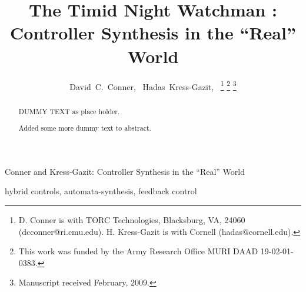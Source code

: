 \documentclass[journal,twoside]{IEEEtran}
\def \TROTITLE {{ The Timid Night Watchman :\\ Controller Synthesis in the ``Real'' World}}
\def \SHORTTROTITLE {{ Controller Synthesis in the ``Real'' World }}
\begin{document}
%

\title{\TROTITLE}

\author{David~C.~Conner,~
  Hadas~Kress-Gazit,~%
  \thanks{D. Conner is with TORC Technologies, Blacksburg, VA, 24060
    (dcconner@ri.cmu.edu).  H. Kress-Gazit is with Cornell
    (hadas@cornell.edu).}%
  \thanks{This work was funded by the Army Research Office MURI DAAD
    19-02-01-0383.}%
  \thanks{Manuscript received February, 2009.}
 }

{Conner and Kress-Gazit: \SHORTTROTITLE }


\maketitle


\begin{abstract}

  DUMMY TEXT as place holder.  

  Added some more dummy text to abstract.
\end{abstract}


\begin{IEEEkeywords}
  hybrid controls, automata-synthesis, feedback control
\end{IEEEkeywords}

%
\IEEEpeerreviewmaketitle
\end{document}
